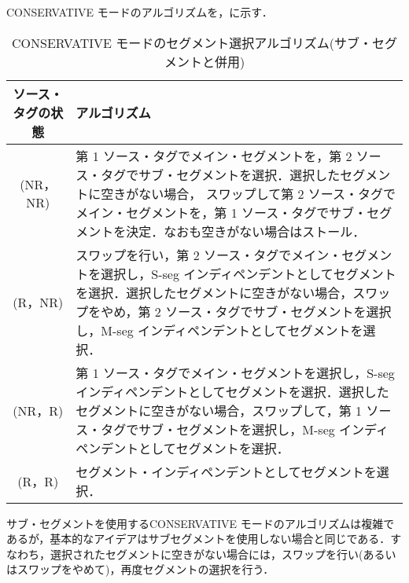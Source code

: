 CONSERVATIVE モードのアルゴリズムを，に示す．
\begin{table}[htb]
  \caption{CONSERVATIVE モードのセグメント選択アルゴリズム(サブ・セグメントと併用)}
  \footnotesize
  \center
   \begin{tabular}{|c|p{13.5cm}|} \hline \hline
    ソース・タグの状態 & アルゴリズム \\ \hline
    (NR，NR) & 第 1 ソース・タグでメイン・セグメントを，第 2 ソース・タグでサブ・セグメントを選択．選択したセグメントに空きがない場合， スワップして第 2 ソース・タグでメイン・セグメントを，第 1 ソース・タグでサブ・セグメントを決定．なおも空きがない場合はストール． \\ \hline
    (R，NR) & スワップを行い，第 2 ソース・タグでメイン・セグメントを選択し，S-seg インディペンデントとしてセグメントを選択．選択したセグメントに空きがない場合，スワップをやめ，第 2 ソース・タグでサブ・セグメントを選択し，M-seg インディペンデントとしてセグメントを選択．\\ \hline
    (NR，R) & 第 1 ソース・タグでメイン・セグメントを選択し，S-seg インディペンデントとしてセグメントを選択．選択したセグメントに空きがない場合，スワップして，第 1 ソース・タグでサブ・セグメントを選択し，M-seg インディペンデントとしてセグメントを選択．\\ \hline
    (R，R) & セグメント・インディペンデントとしてセグメントを選択． \\ \hline
  \end{tabular}
  \label{tab:cons_algorithm_subseg}
\end{table}
サブ・セグメントを使用するCONSERVATIVE モードのアルゴリズムは複雑であるが，基本的なアイデアはサブセグメントを使用しない場合と同じである．すなわち，選択されたセグメントに空きがない場合には，スワップを行い(あるいはスワップをやめて)，再度セグメントの選択を行う．

